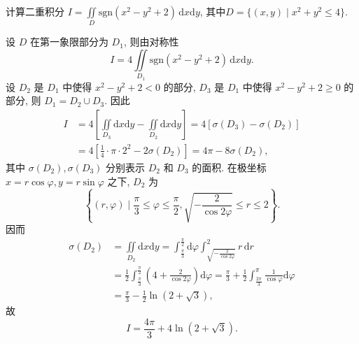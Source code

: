 \documentclass[../../main.tex]{subfiles}%
\begin{document}
\begin{example}
计算二重积分 \( I = \iint\limits_D \text{sgn}(x^2 - y^2 + 2) \, \mathrm{d}x\mathrm{d}y \), 其中$D = \{ (x,y) \mid x^2 + y^2 \leqslant 4 \}.$
\end{example}
\begin{solution}

设 \( D \) 在第一象限部分为 \( D_1 \), 则由对称性
\[
I = 4 \iint\limits_{D_1} \text{sgn}(x^2 - y^2 + 2) \, \mathrm{d}x\mathrm{d}y.
\]
设 \( D_2 \) 是 \( D_1 \) 中使得 \( x^2 - y^2 + 2 < 0 \) 的部分, \( D_3 \) 是 \( D_1 \) 中使得 \( x^2 - y^2 + 2 \geqslant 0 \) 的部分, 则 \( D_1 = D_2 \cup D_3 \). 因此
\begin{align*}
I &= 4 \left[ \iint\limits_{D_3} \mathrm{d}x\mathrm{d}y - \iint\limits_{D_2} \mathrm{d}x\mathrm{d}y \right] = 4 [\sigma(D_3) - \sigma(D_2)]
\\
&= 4 \left[ \frac{1}{4} \cdot \pi \cdot 2^2 - 2\sigma(D_2) \right] = 4\pi - 8\sigma(D_2),
\end{align*}
其中 \( \sigma(D_2), \sigma(D_3) \) 分别表示 \( D_2 \) 和 \( D_3 \) 的面积. 在极坐标 \( x = r\cos\varphi, y = r\sin\varphi \) 之下, \( D_2 \) 为
\[
\left\{ (r,\varphi) \mid \frac{\pi}{3} \leqslant \varphi \leqslant \frac{\pi}{2}, \sqrt{-\frac{2}{\cos 2\varphi}} \leqslant r \leqslant 2 \right\}.
\]
因而
\begin{align*}
\sigma(D_2) &= \iint\limits_{D_2} \mathrm{d}x\mathrm{d}y = \int_{\frac{\pi}{3}}^{\frac{\pi}{2}} \mathrm{d}\varphi \int_{\sqrt{-\frac{2}{\cos 2\varphi}}}^2 r \, \mathrm{d}r
\\
&= \frac{1}{2} \int_{\frac{\pi}{3}}^{\frac{\pi}{2}} \left( 4 + \frac{2}{\cos 2\varphi} \right) \mathrm{d}\varphi = \frac{\pi}{3} + \frac{1}{2} \int_{\frac{2\pi}{3}}^{\pi} \frac{1}{\cos\varphi} \mathrm{d}\varphi
\\
&= \frac{\pi}{3} - \frac{1}{2} \ln(2 + \sqrt{3}),
\end{align*}
故
\[
I = \frac{4\pi}{3} + 4\ln(2 + \sqrt{3}).
\]

\end{solution}
\end{document}
